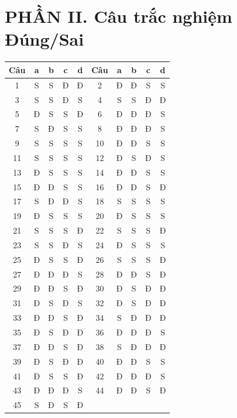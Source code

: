 \documentclass[12pt]{article}
\begin{document}
\section*{PHẦN II. Câu trắc nghiệm Đúng/Sai}
\begin{center}
	\begin{tabular}{|c|c|c|c|c|c|c|c|c|c|}
		\hline
		\textbf{Câu} & \textbf{a} & \textbf{b} & \textbf{c} & \textbf{d} & \textbf{Câu} & \textbf{a} & \textbf{b} & \textbf{c} & \textbf{d} \\
		\hline
		1 & S & S & Đ & Đ & 2 & Đ & Đ & S & S \\
		\hline
		3 & S & S & Đ & S & 4 & S & S & Đ & Đ \\
		\hline
		5 & Đ & S & S & Đ & 6 & Đ & Đ & Đ & S \\
		\hline
		7 & S & Đ & S & S & 8 & Đ & Đ & Đ & S \\
		\hline
		9 & S & S & S & S & 10 & Đ & Đ & S & S \\
		\hline
		11 & S & S & S & S & 12 & Đ & S & Đ & S \\
		\hline
		13 & Đ & S & S & S & 14 & Đ & Đ & S & S \\
		\hline
		15 & Đ & Đ & S & S & 16 & Đ & Đ & S & Đ \\
		\hline
		17 & S & Đ & Đ & S & 18 & S & S & S & S \\
		\hline
		19 & Đ & S & S & S & 20 & Đ & S & S & S \\
		\hline
		21 & S & S & S & Đ & 22 & S & S & S & Đ \\
		\hline
		23 & S & S & Đ & S & 24 & Đ & S & S & S \\
		\hline
		25 & Đ & S & S & Đ & 26 & S & S & S & Đ \\
		\hline
		27 & Đ & Đ & Đ & S & 28 & Đ & Đ & S & Đ \\
		\hline
		29 & Đ & Đ & S & Đ & 30 & Đ & S & Đ & Đ \\
		\hline
		31 & Đ & S & Đ & S & 32 & Đ & S & Đ & Đ \\
		\hline
		33 & Đ & Đ & S & Đ & 34 & S & Đ & Đ & Đ \\
		\hline
		35 & Đ & S & Đ & Đ & 36 & Đ & Đ & Đ & S \\
		\hline
		37 & Đ & Đ & S & Đ & 38 & S & Đ & Đ & Đ \\
		\hline
		39 & Đ & S & Đ & Đ & 40 & Đ & Đ & S & S \\
		\hline
		41 & Đ & S & S & Đ & 42 & Đ & Đ & Đ & S \\
		\hline
		43 & Đ & Đ & Đ & S & 44 & Đ & Đ & S & Đ \\
		\hline
		45 & S & Đ & S & Đ &  & & & &  \\
		\hline
		\end{tabular}
\end{center}
\end{document}
